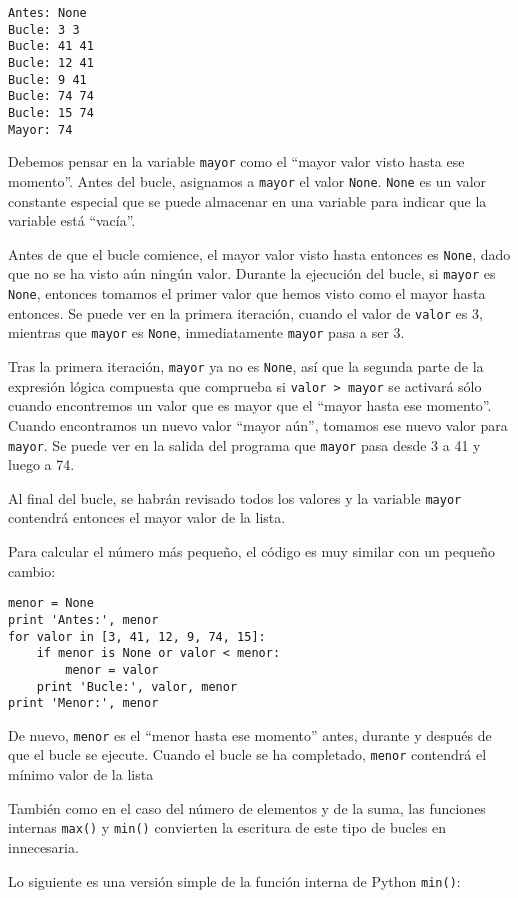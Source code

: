 \beforeverb
\begin{verbatim}
Antes: None
Bucle: 3 3
Bucle: 41 41
Bucle: 12 41
Bucle: 9 41
Bucle: 74 74
Bucle: 15 74
Mayor: 74
\end{verbatim}
\afterverb
%
Debemos pensar en la variable {\tt mayor} como
el ``mayor valor visto hasta ese momento''.
Antes del bucle, asignamos a {\tt mayor} el valor {\tt None}.
{\tt None} es un valor constante especial que se puede
almacenar en una variable para indicar
que la variable está ``vacía''.

Antes de que el bucle comience, el mayor valor visto hasta entonces
es {\tt None}, dado que no se ha visto aún ningún valor. Durante la
ejecución del bucle, si {\tt mayor} es {\tt None}, entonces
tomamos el primer valor que hemos visto como el mayor hasta entonces. Se puede ver en
la primera iteración, cuando el valor de {\tt valor} es 3,
mientras que {\tt mayor} es {\tt None}, inmediatamente
{\tt mayor} pasa a ser 3.

Tras la primera iteración, {\tt mayor} ya no es {\tt None},
así que la segunda parte de la expresión lógica compuesta que comprueba
si {\tt valor > mayor} se activará sólo cuando encontremos un valor que es
mayor que el ``mayor hasta ese momento''. Cuando encontramos un nuevo valor ``mayor aún'',
tomamos ese nuevo valor para {\tt mayor}. Se puede ver en la salida
del programa que {\tt mayor} pasa desde 3 a 41 y luego a 74.

Al final del bucle, se habrán revisado todos los valores y la
variable {\tt mayor} contendrá entonces el mayor valor de
la lista.

Para calcular el número más pequeño, el código es muy similar con un
pequeño cambio:

\beforeverb
\begin{verbatim}
menor = None
print 'Antes:', menor
for valor in [3, 41, 12, 9, 74, 15]:
    if menor is None or valor < menor:
        menor = valor
    print 'Bucle:', valor, menor
print 'Menor:', menor
\end{verbatim}
\afterverb
%
De nuevo, {\tt menor} es el ``menor hasta ese momento'' antes, durante y después de
que el bucle se ejecute. Cuando el bucle se ha completado, {\tt menor} contendrá
el mínimo valor de la lista

También como en el caso del número de elementos y de la suma, las funciones internas
{\tt max()} y {\tt min()} convierten la escritura de este tipo de bucles
en innecesaria.

Lo siguiente es una versión simple de la función interna de Python
{\tt min()}:


